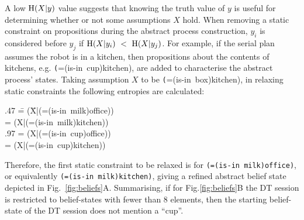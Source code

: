 A low $\entropy(X|y)$ value suggests that knowing the truth value of
$y$ is useful for determining whether or not some assumptions $X$
hold. When removing a static constraint on propositions during the
abstract process construction, $y_i$ is considered before $y_j$ if
$\entropy(X|y_i)~<~\entropy(X|y_j)$. For example, if the serial plan
assumes the robot is in a kitchen, then propositions about the
contents of kitchens, e.g. {\texttt (=(is-in~cup)kitchen)}, are
added to characterise the abstract process' states. Taking
assumption $X$ to be {\texttt (=(is-in~box)kitchen)}, in relaxing
static constraints the following entropies are calculated:

\small
\begin{tabtt}
.47 \= = \entropy(\=X|(=(is-in~milk)office))\+ \\
 = \entropy(X|(=(is-in~milk)kitchen)) \-\\
.97 = \entropy(X|(=(is-in~cup)office))\+\\
 = \entropy(X|(=(is-in~cup)kitchen))
\end{tabtt}
\normalsize

\noindent Therefore, the first static constraint to be relaxed is for
\texttt{(=(is-in~milk)office)}, or
equivalently \texttt{(=(is-in~milk)kitchen)}, giving a refined
abstract belief state depicted in
Fig.~\ref{fig:beliefs}A. Summarising, if for Fig.\ref{fig:beliefs}B
the DT session is restricted to belief-states with fewer than $8$
elements, then the starting belief-state of the DT session does not
mention a ``cup''.


